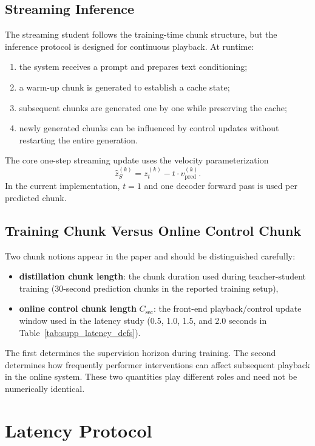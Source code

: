 \documentclass[11pt]{article}
\begin{document}
\subsection{Streaming Inference}

The streaming student follows the training-time chunk structure, but the inference protocol is designed for continuous playback. At runtime:
\begin{enumerate}
    \item the system receives a prompt and prepares text conditioning;
    \item a warm-up chunk is generated to establish a cache state;
    \item subsequent chunks are generated one by one while preserving the cache;
    \item newly generated chunks can be influenced by control updates without restarting the entire generation.
\end{enumerate}

The core one-step streaming update uses the velocity parameterization
\[
\hat{z}_S^{(k)} = z_t^{(k)} - t \cdot v_{\mathrm{pred}}^{(k)}.
\]
In the current implementation, \(t=1\) and one decoder forward pass is used per predicted chunk.

\subsection{Training Chunk Versus Online Control Chunk}

Two chunk notions appear in the paper and should be distinguished carefully:
\begin{itemize}
    \item \textbf{distillation chunk length}: the chunk duration used during teacher-student training (30-second prediction chunks in the reported training setup),
    \item \textbf{online control chunk length} \(C_{\mathrm{sec}}\): the front-end playback/control update window used in the latency study (0.5, 1.0, 1.5, and 2.0 seconds in Table~\ref{tab:supp_latency_defs}).
\end{itemize}

The first determines the supervision horizon during training. The second determines how frequently performer interventions can affect subsequent playback in the online system. These two quantities play different roles and need not be numerically identical.

\section{Latency Protocol}
\end{document}
